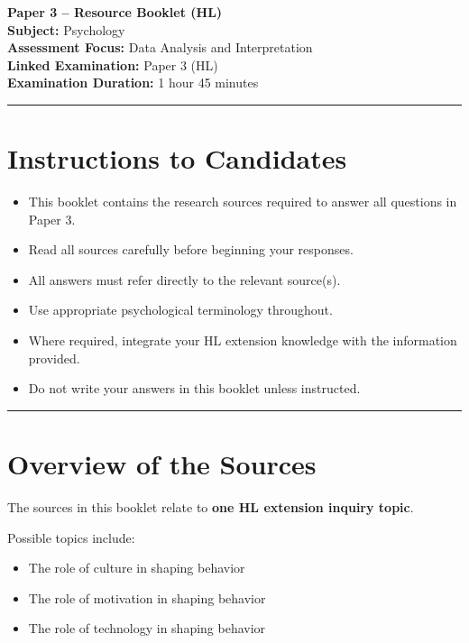 \documentclass[12pt,a4paper]{article}
\begin{document}
\begin{center}
    {\LARGE \textbf{Paper 3 – Resource Booklet (HL)}}\\
    \vspace{0.5em}
    \textbf{Subject:} Psychology\\
    \textbf{Assessment Focus:} Data Analysis and Interpretation\\
    \textbf{Linked Examination:} Paper 3 (HL)\\
    \textbf{Examination Duration:} 1 hour 45 minutes
\end{center}

\vspace{1em}

\hrule
\vspace{1em}

\section*{Instructions to Candidates}

\begin{itemize}
    \item This booklet contains the research sources required to answer all questions in Paper 3.
    \item Read all sources carefully before beginning your responses.
    \item All answers must refer directly to the relevant source(s).
    \item Use appropriate psychological terminology throughout.
    \item Where required, integrate your HL extension knowledge with the information provided.
    \item Do not write your answers in this booklet unless instructed.
\end{itemize}

\vspace{1em}
\hrule
\vspace{1em}

\section*{Overview of the Sources}

The sources in this booklet relate to \textbf{one HL extension inquiry topic}.  

Possible topics include:

\begin{itemize}
    \item The role of culture in shaping behavior
    \item The role of motivation in shaping behavior
    \item The role of technology in shaping behavior
\end{itemize}
\end{document}
